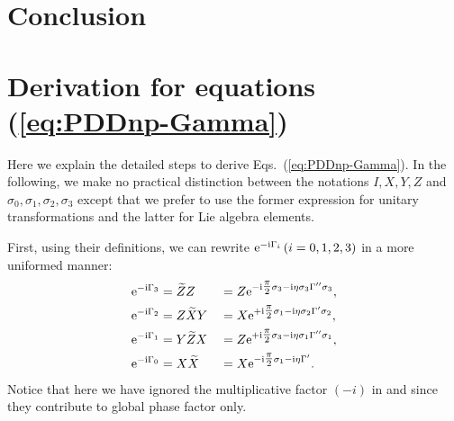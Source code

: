 \documentclass[pra,reprint,superscriptaddress]{revtex4-2}
\newcommand{\wt}[1]{\widetilde{#1}}
\begin{document}
\section{Conclusion}




\acknowledgments
{}


\newpage
\appendix
\section{Derivation for equations (\ref{eq:PDDnp-Gamma})}\label{app:PDDnpDerivation}
Here we explain the detailed steps to derive Eqs.~\!(\ref{eq:PDDnp-Gamma}).
In the following, we make no practical distinction between the notations $I,X,Y,Z$ and $\sigma_0,\sigma_1,\sigma_2,\sigma_3$ except that we prefer to use the former 
expression for unitary transformations and the latter for Lie algebra elements.

First, using their definitions, we can rewrite $\mathrm{e}^{-\mathrm{i}\Gamma_i}\, (i=0,1,2,3)$  in a more uniformed manner: 
\begin{subequations} \label{app:PDDnp-expGamma}
 \begin{align}
 \label{app:PDDnp-expGamma3}
\upe^{-\upi \Gamma_3} &=\wt Z Z &&=
Z \upe^{-\upi  \tfrac{\pi}{2} \sigma_3 -\upi \eta \sigma_3\Gamma''\sigma_3},\\
\label{app:PDDnp-expGamma2}
\upe^{-\upi \Gamma_2} &= Z \wt X Y &&=
X \upe^{+\upi  \tfrac{\pi}{2} \sigma_1 -\upi \eta \sigma_2\Gamma'\sigma_2},\\
\label{app:PDDnp-expGamma1}
\upe^{-\upi \Gamma_1} &= Y \wt Z X &&=
Z \upe^{+\upi  \tfrac{\pi}{2} \sigma_3 -\upi \eta \sigma_1\Gamma''\sigma_1},\\
\label{app:PDDnp-expGamma0}
\upe^{-\upi \Gamma_0} &= X \wt X &&= 
X \upe^{-\upi  \tfrac{\pi}{2} \sigma_1 -\upi \eta\Gamma'}.
\end{align}
\end{subequations}
Notice that here we have ignored the multiplicative factor $(-i)$ in  and  since they contribute to global phase factor only.
\end{document}
